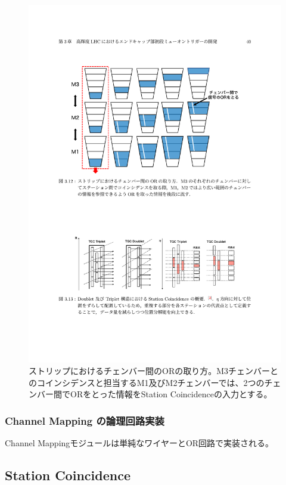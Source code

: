 \begin{figure} 
\centering
\includegraphics[width=16cm]{fig/SL/Channel_Mapping.pdf}
\caption[]{ストリップにおけるチェンバー間のORの取り方。M3チェンバーとのコインシデンスと担当するM1及びM2チェンバーでは、2つのチェンバー間でORをとった情報をStation Coincidenceの入力とする。\cite{mt_kawamoto}}
\label{Channel_Mapping}
\end{figure}

\subsubsection*{Channel Mapping の論理回路実装}
Channel Mappingモジュールは単純なワイヤーとOR回路で実装される。

\subsection{Station Coincidence}
